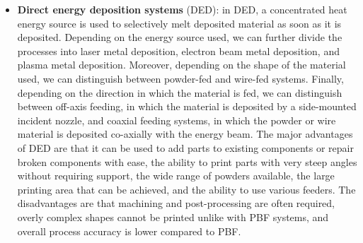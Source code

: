 \begin{itemize}
    \item \textbf{Direct energy deposition systems} (DED): in DED, a concentrated heat energy source is used to selectively melt deposited material as soon as it is deposited. Depending on the energy source used, we can further divide the processes into laser metal deposition, electron beam metal deposition, and plasma metal deposition. Moreover, depending on the shape of the material used, we can distinguish between powder-fed and wire-fed systems. Finally, depending on the direction in which the material is fed, we can distinguish between off-axis feeding, in which the material is deposited by a side-mounted incident nozzle, and coaxial feeding systems, in which the powder or wire material is deposited co-axially with the energy beam. The major advantages of DED are that it can be used to add parts to existing components or repair broken components with ease, the ability to print parts with very steep angles without requiring support, the wide range of powders available, the large printing area that can be achieved, and the ability to use various feeders. The disadvantages are that machining and post-processing are often required, overly complex shapes cannot be printed unlike with PBF systems, and overall process accuracy is lower compared to PBF.
    
\end{itemize}



